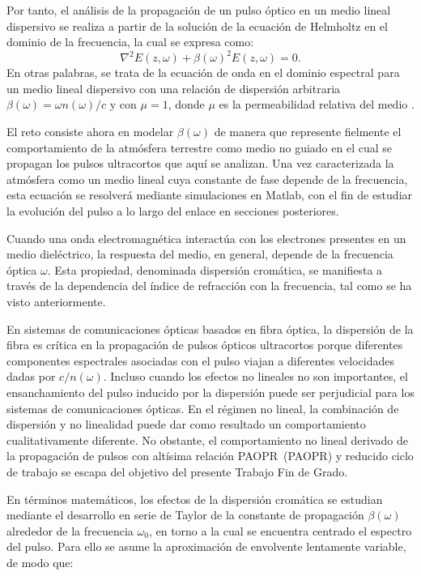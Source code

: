 Por tanto, el análisis de la propagación de un pulso óptico en un medio lineal dispersivo se realiza a partir de la solución de la ecuación de Helmholtz en el dominio de la frecuencia, la cual se expresa como:
\begin{equation}
\nabla^{2}E(z,\omega)+\beta(\omega)^{2}E(z,\omega)=0.
\end{equation}
En otras palabras, se trata de la ecuación de onda en el dominio espectral para un medio lineal dispersivo con una relación de dispersión arbitraria $\beta(\omega)=\omega n(\omega)/c$ y con $\mu=1$, donde $\mu$ es la permeabilidad relativa del medio \cite{Agrawal,Keller}.

El reto consiste ahora en modelar $\beta(\omega)$ de manera que represente fielmente el comportamiento de la atmósfera terrestre como medio no guiado en el cual se propagan los pulsos ultracortos que aquí se analizan. Una vez caracterizada la atmósfera como un medio lineal cuya constante de fase depende de la frecuencia, esta ecuación se resolverá mediante simulaciones en Matlab, con el fin de estudiar la evolución del pulso a lo largo del enlace en secciones posteriores.

Cuando una onda electromagnética interactúa con los electrones presentes en un medio dieléctrico, la respuesta del medio, en general, depende de la frecuencia óptica $\omega$. Esta propiedad, denominada dispersión cromática, se manifiesta a través de la dependencia del índice de refracción con la frecuencia, tal como se ha visto anteriormente.

En sistemas de comunicaciones ópticas basados en fibra óptica, la dispersión de la fibra es crítica en la propagación de pulsos ópticos ultracortos porque diferentes componentes espectrales asociadas con el pulso viajan a diferentes velocidades dadas por $c/n(\omega)$. Incluso cuando los efectos no lineales no son importantes, el ensanchamiento del pulso inducido por la dispersión puede ser perjudicial para los sistemas de comunicaciones ópticas. En el régimen no lineal, la combinación de dispersión y no linealidad puede dar como resultado un comportamiento cualitativamente diferente. No obstante, el comportamiento no lineal derivado de la propagación de pulsos con altísima relación \acs{PAOPR}~(\acl{PAOPR}) y reducido ciclo de trabajo se escapa del objetivo del presente Trabajo Fin de Grado.

En términos matemáticos, los efectos de la dispersión cromática se estudian mediante el desarrollo en serie de Taylor de la constante de propagación $\beta(\omega)$ alrededor de la frecuencia $\omega_{0}$, en torno a la cual se encuentra centrado el espectro del pulso. Para ello se asume la aproximación de envolvente lentamente variable, de modo que:

